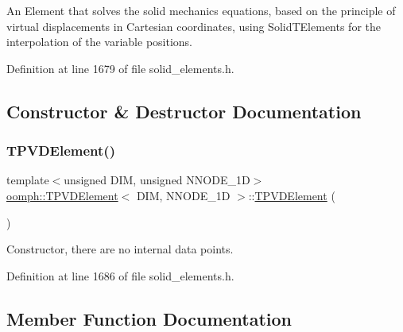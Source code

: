 An Element that solves the solid mechanics equations, based on the principle of virtual displacements in Cartesian coordinates, using Solid\+T\+Elements for the interpolation of the variable positions. 

Definition at line 1679 of file solid\+\_\+elements.\+h.



\subsection{Constructor \& Destructor Documentation}
\mbox{\label{classoomph_1_1TPVDElement_a1e9ae25f5697a46ae4d53f4db0aafa05}} 
\subsubsection{\texorpdfstring{T\+P\+V\+D\+Element()}{TPVDElement()}}
{\footnotesize\ttfamily template$<$unsigned D\+IM, unsigned N\+N\+O\+D\+E\+\_\+1D$>$ \\
\hyperlink{classoomph_1_1TPVDElement}{oomph\+::\+T\+P\+V\+D\+Element}$<$ D\+IM, N\+N\+O\+D\+E\+\_\+1D $>$\+::\hyperlink{classoomph_1_1TPVDElement}{T\+P\+V\+D\+Element} (\begin{DoxyParamCaption}{ }\end{DoxyParamCaption})\hspace{0.3cm}{\ttfamily [inline]}}



Constructor, there are no internal data points. 



Definition at line 1686 of file solid\+\_\+elements.\+h.



\subsection{Member Function Documentation}
\mbox{\label{classoomph_1_1TPVDElement_a156300359d98bc69d81773b3b609329f}} 
